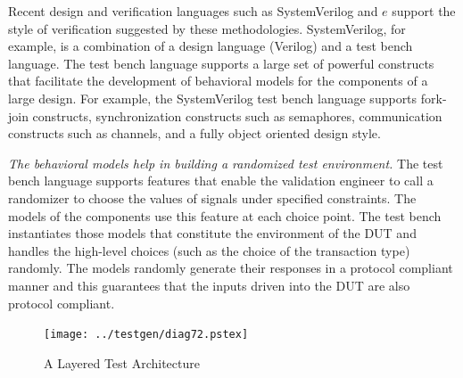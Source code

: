 \noindent
Recent design and verification languages such as SystemVerilog and $e$ support
the style of verification suggested by these methodologies. SystemVerilog,
for example, is a combination of a design language (Verilog) and a test bench
language.
The test bench language supports a large set of powerful constructs
that facilitate the development of behavioral models for the components of a
large design. For example, the SystemVerilog test bench language supports
fork-join constructs, synchronization constructs such as semaphores,
communication constructs such as channels, and a fully object oriented
design style.

\noindent
{\em The behavioral models help in building a randomized test
environment.} The test bench language supports features that enable the
validation engineer to call a randomizer to choose the values of signals
under specified constraints. The models of the components use this feature
at each choice point. The test bench instantiates those models that
constitute the environment of the DUT and handles the high-level choices
(such as the choice of the transaction type) randomly. The models randomly
generate their responses in a protocol compliant manner and this guarantees
that the inputs driven into the DUT are also protocol compliant. 

\begin{figure}[htb]
\centering
\texttt{[image: ../testgen/diag72.pstex]}
\center
\caption{A Layered Test Architecture} \label{fig2.13}
\end{figure}

